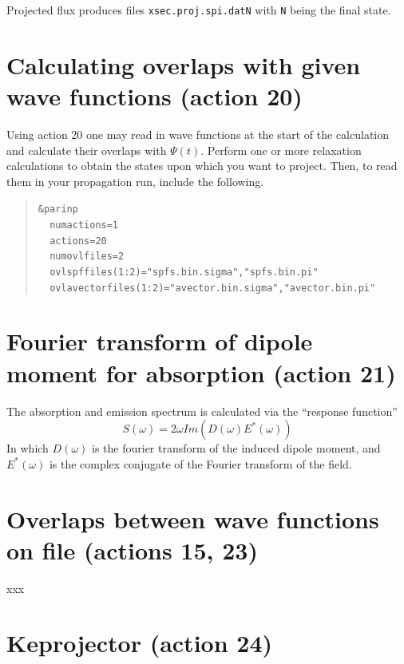 \documentclass[10pt,leqno, oneside]{book}
\begin{document}
Projected flux produces files \verb#xsec.proj.spi.datN# with \verb#N# being the final state.

\section{Calculating overlaps with given wave functions (action 20)}

Using action 20 one may read in wave functions at the start of the calculation and calculate their overlaps with $\Psi(t)$.
%
Perform one or more relaxation calculations to obtain the states upon which you want to project.  Then, to read them in your
propagation run, include the following.

\begin{quote}
{\footnotesize
\verb#&parinp# \\
\verb#  numactions=1#\\
\verb#  actions=20# \\
\verb#  numovlfiles=2# \\
\verb#  ovlspffiles(1:2)="spfs.bin.sigma","spfs.bin.pi"# \\
\verb#  ovlavectorfiles(1:2)="avector.bin.sigma","avector.bin.pi"# \\
}\end{quote}


\section{Fourier transform of dipole moment for absorption (action 21)}

The absorption and emission spectrum is calculated via the ``response function''
\begin{equation}
S(\omega) = 2 \omega Im (D(\omega) E^*(\omega))
\end{equation}
In which $D(\omega)$ is the fourier transform of the induced dipole moment, and $E^*(\omega)$ is the complex conjugate of
the Fourier transform of the field.


\section{Overlaps between wave functions on file (actions 15, 23)}

xxx

\section{Keprojector (action 24)}
\end{document}
